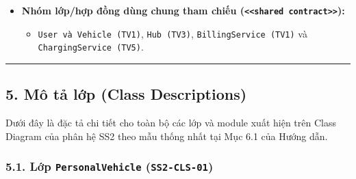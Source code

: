 \documentclass[11pt,a4paper]{article}
\providecommand{\tightlist}{%
  \setlength{\itemsep}{0pt}\setlength{\parskip}{0pt}}
\begin{document}
\begin{itemize}
  \begin{itemize}
  \tightlist
  \item
    \texttt{personal\_ev.render}
    (\texttt{\textless{}\textless{}implemented\ UI\textgreater{}\textgreater{}}
    --- \texttt{SS2-CLS-05}) và \texttt{core.personal\_ev}
    (\texttt{\textless{}\textless{}implemented\ module\textgreater{}\textgreater{}}
    --- \texttt{SS2-CLS-06}).
  \end{itemize}
\item
  \textbf{Nhóm lớp/hợp đồng dùng chung tham chiếu
  (\texttt{\textless{}\textless{}shared\ contract\textgreater{}\textgreater{}}):}

  \begin{itemize}
  \tightlist
  \item
    \texttt{User\ và\ Vehicle\ (TV1)}, \texttt{Hub\ (TV3)},
    \texttt{BillingService\ (TV1)} và \texttt{ChargingService\ (TV5)}.
  \end{itemize}
\end{itemize}

\begin{center}\rule{0.5\linewidth}{0.5pt}\end{center}

\hypertarget{muxf4-tux1ea3-lux1edbp-class-descriptions}{%
\subsection{5. Mô tả lớp (Class
Descriptions)}\label{muxf4-tux1ea3-lux1edbp-class-descriptions}}

Dưới đây là đặc tả chi tiết cho toàn bộ các lớp và module xuất hiện trên
Class Diagram của phân hệ SS2 theo mẫu thống nhất tại Mục 6.1 của Hướng
dẫn.

\hypertarget{lux1edbp-personalvehicle-ss2-cls-01}{%
\subsubsection{\texorpdfstring{5.1. Lớp \texttt{PersonalVehicle}
(\texttt{SS2-CLS-01})}{5.1. Lớp PersonalVehicle (SS2-CLS-01)}}\label{lux1edbp-personalvehicle-ss2-cls-01}}
\end{document}
